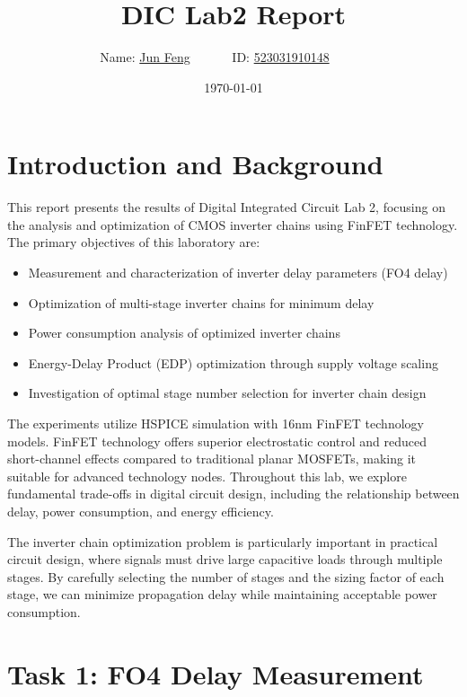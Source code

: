 \documentclass[UTF8,12pt,a4paper]{ctexart}
\title{DIC Lab2 Report}
\author{
	Name: \underline{Jun Feng}~~~~~~
	ID: \underline{523031910148}~~~~~~}
\date{\today}
\begin{document}
\fancyfoot[C]{\thepage}

\maketitle

\section{Introduction and Background}

This report presents the results of Digital Integrated Circuit Lab 2, focusing on the analysis and optimization of CMOS inverter chains using FinFET technology. The primary objectives of this laboratory are:

\begin{itemize}
    \item Measurement and characterization of inverter delay parameters (FO4 delay)
    \item Optimization of multi-stage inverter chains for minimum delay
    \item Power consumption analysis of optimized inverter chains
    \item Energy-Delay Product (EDP) optimization through supply voltage scaling
    \item Investigation of optimal stage number selection for inverter chain design
\end{itemize}

The experiments utilize HSPICE simulation with 16nm FinFET technology models. FinFET technology offers superior electrostatic control and reduced short-channel effects compared to traditional planar MOSFETs, making it suitable for advanced technology nodes. Throughout this lab, we explore fundamental trade-offs in digital circuit design, including the relationship between delay, power consumption, and energy efficiency.

The inverter chain optimization problem is particularly important in practical circuit design, where signals must drive large capacitive loads through multiple stages. By carefully selecting the number of stages and the sizing factor of each stage, we can minimize propagation delay while maintaining acceptable power consumption.

\section{Task 1: FO4 Delay Measurement}
\end{document}
